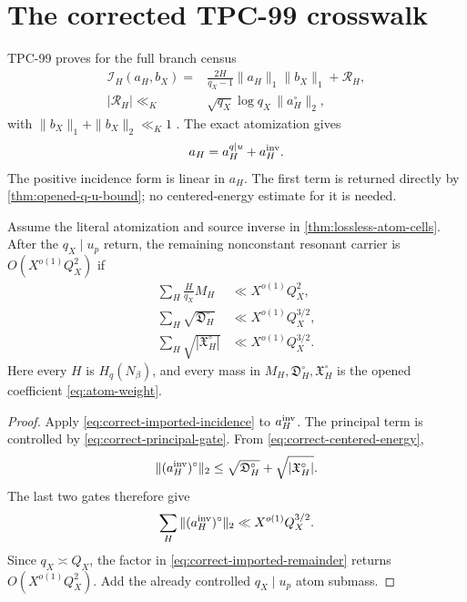 \section{The corrected TPC-99 crosswalk}
\label{sec:native-crosswalk}

TPC-99 proves for the full branch census
\begin{align}
 \mathcal I_H(a_H,b_X)
 ={}&
 \frac{2H}{q_X-1}\|a_H\|_1\|b_X\|_1
 +\mathcal R_H,
\label{eq:correct-imported-incidence}\\
 |\mathcal R_H|
 \ll_K{}&
 \sqrt{q_X}\log q_X\,\|a_H^\circ\|_2,
\label{eq:correct-imported-remainder}
\end{align}
with \(\|b_X\|_1+\|b_X\|_2\ll_K1\)
\citep{WangTPC99}.  The exact atomization gives
\[
 a_H=a_H^{q\mid u}+a_H^{\rm inv}.
\]
The positive incidence form is linear in \(a_H\).  The first term is
returned directly by \cref{thm:opened-q-u-bound}; no centered-energy
estimate for it is needed.

\begin{theorem}
\label{thm:corrected-three-gates}
Assume the literal atomization and source inverse in
\cref{thm:lossless-atom-cells}.  After the
\(q_X\mid u_p\) return, the remaining nonconstant resonant carrier
is \(O(X^{o(1)}Q_X^2)\) if
\begin{align}
 \sum_H\frac{H}{q_X}M_H
 &\ll X^{o(1)}Q_X^2,
\label{eq:correct-principal-gate}\\
 \sum_H\sqrt{\mathfrak D_H^\circ}
 &\ll X^{o(1)}Q_X^{3/2},
\label{eq:correct-diagonal-gate}\\
 \sum_H\sqrt{|\mathfrak X_H^\circ|}
 &\ll X^{o(1)}Q_X^{3/2}.
\label{eq:correct-cross-gate}
\end{align}
Here every \(H\) is \(H_q(N_\beta)\), and every mass in
\(M_H,\mathfrak D_H^\circ,\mathfrak X_H^\circ\) is the opened
coefficient \eqref{eq:atom-weight}.
\end{theorem}

\begin{proof}
Apply \eqref{eq:correct-imported-incidence} to
\(a_H^{\rm inv}\).  The principal term is controlled by
\eqref{eq:correct-principal-gate}.  From
\eqref{eq:correct-centered-energy},
\[
 \|(a_H^{\rm inv})^\circ\|_2
 \le
 \sqrt{\mathfrak D_H^\circ}
 +\sqrt{|\mathfrak X_H^\circ|}.
\]
The last two gates therefore give
\[
 \sum_H\|(a_H^{\rm inv})^\circ\|_2
 \ll X^{o(1)}Q_X^{3/2}.
\]
Since \(q_X\asymp Q_X\), the factor in
\eqref{eq:correct-imported-remainder} returns
\(O(X^{o(1)}Q_X^2)\).  Add the already controlled
\(q_X\mid u_p\) atom submass.
\end{proof}

